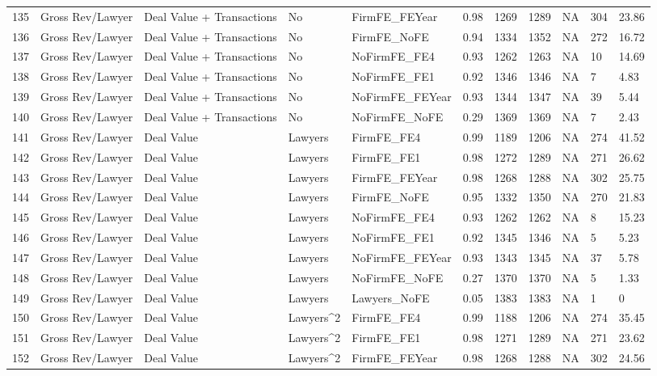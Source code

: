 \documentclass{article}
\begin{document}
\begin{table}[H]
\begin{tabular}{rllllllllll}
  135 & Gross Rev/Lawyer & Deal Value + Transactions & No & FirmFE\_FEYear & 0.98 & 1269 & 1289 & NA & 304 & 23.86 \\ 
  136 & Gross Rev/Lawyer & Deal Value + Transactions & No & FirmFE\_NoFE & 0.94 & 1334 & 1352 & NA & 272 & 16.72 \\ 
  137 & Gross Rev/Lawyer & Deal Value + Transactions & No & NoFirmFE\_FE4 & 0.93 & 1262 & 1263 & NA & 10 & 14.69 \\ 
  138 & Gross Rev/Lawyer & Deal Value + Transactions & No & NoFirmFE\_FE1 & 0.92 & 1346 & 1346 & NA & 7 & 4.83 \\ 
  139 & Gross Rev/Lawyer & Deal Value + Transactions & No & NoFirmFE\_FEYear & 0.93 & 1344 & 1347 & NA & 39 & 5.44 \\ 
  140 & Gross Rev/Lawyer & Deal Value + Transactions & No & NoFirmFE\_NoFE & 0.29 & 1369 & 1369 & NA & 7 & 2.43 \\ 
  141 & Gross Rev/Lawyer & Deal Value & Lawyers & FirmFE\_FE4 & 0.99 & 1189 & 1206 & NA & 274 & 41.52 \\ 
  142 & Gross Rev/Lawyer & Deal Value & Lawyers & FirmFE\_FE1 & 0.98 & 1272 & 1289 & NA & 271 & 26.62 \\ 
  143 & Gross Rev/Lawyer & Deal Value & Lawyers & FirmFE\_FEYear & 0.98 & 1268 & 1288 & NA & 302 & 25.75 \\ 
  144 & Gross Rev/Lawyer & Deal Value & Lawyers & FirmFE\_NoFE & 0.95 & 1332 & 1350 & NA & 270 & 21.83 \\ 
  145 & Gross Rev/Lawyer & Deal Value & Lawyers & NoFirmFE\_FE4 & 0.93 & 1262 & 1262 & NA & 8 & 15.23 \\ 
  146 & Gross Rev/Lawyer & Deal Value & Lawyers & NoFirmFE\_FE1 & 0.92 & 1345 & 1346 & NA & 5 & 5.23 \\ 
  147 & Gross Rev/Lawyer & Deal Value & Lawyers & NoFirmFE\_FEYear & 0.93 & 1343 & 1345 & NA & 37 & 5.78 \\ 
  148 & Gross Rev/Lawyer & Deal Value & Lawyers & NoFirmFE\_NoFE & 0.27 & 1370 & 1370 & NA & 5 & 1.33 \\ 
  149 & Gross Rev/Lawyer & Deal Value & Lawyers & Lawyers\_NoFE & 0.05 & 1383 & 1383 & NA & 1 & 0 \\ 
  150 & Gross Rev/Lawyer & Deal Value & Lawyers^2 & FirmFE\_FE4 & 0.99 & 1188 & 1206 & NA & 274 & 35.45 \\ 
  151 & Gross Rev/Lawyer & Deal Value & Lawyers^2 & FirmFE\_FE1 & 0.98 & 1271 & 1289 & NA & 271 & 23.62 \\ 
  152 & Gross Rev/Lawyer & Deal Value & Lawyers^2 & FirmFE\_FEYear & 0.98 & 1268 & 1288 & NA & 302 & 24.56 \\ 

\end{tabular}
\end{table}
\end{document}
